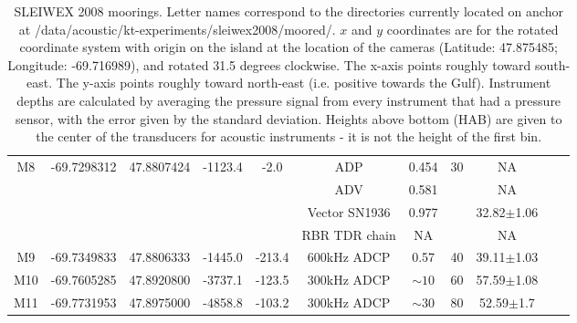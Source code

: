 \documentclass[letterpaper,10pt,landscape]{article}
\begin{document}
\begin{table}
\begin{tabular}{|c|c|c|c|c|c|c|c|c|c|c|}
                                                                                                                                                                                                                          
      \multirow{4}{*}{M8} & \multirow{4}{*}{-69.7298312} & \multirow{4}{*}{47.8807424} & \multirow{4}{*}{-1123.4}  & \multirow{4}{*}{-2.0}   & ADP                & 0.454      & \multirow{4}{*}{30} & NA                & \\ 
                          &                              &                             &                           &                         & ADV                & 0.581      &                     & NA                & \\ 
                          &                              &                             &                           &                         & Vector SN1936      & 0.977      &                     & 32.82$\pm$1.06    & \\ 
                          &                              &                             &                           &                         & RBR TDR chain      & NA         &                     & NA                & \\ \hline
       M9                 & -69.7349833                  & 47.8806333                  & -1445.0                   & -213.4                  & 600kHz ADCP        & 0.57       & 40                  & 39.11$\pm$1.03    & \\ \hline
       M10                & -69.7605285                  & 47.8920800                  & -3737.1                   & -123.5                  & 300kHz ADCP        & $\sim10$   & 60                  & 57.59$\pm$1.08    & \\ \hline
       M11                & -69.7731953                  & 47.8975000                  & -4858.8                   & -103.2                  & 300kHz ADCP        & $\sim30$   & 80                  & 52.59$\pm$1.7     & \\ \hline
    \end{tabular}
    \caption{SLEIWEX 2008 moorings. Letter names correspond to the directories currently located on anchor at /data/acoustic/kt-experiments/sleiwex2008/moored/. $x$ and $y$ coordinates are for the rotated coordinate system with origin on the island at the location of the cameras (Latitude: 47.875485; Longitude: -69.716989), and rotated 31.5 degrees clockwise. The x-axis points roughly toward south-east. The y-axis points roughly toward north-east (i.e. positive towards the Gulf). Instrument depths are calculated by averaging the pressure signal from every instrument that had a pressure sensor, with the error given by the standard deviation. Heights above bottom (HAB) are given to the center of the transducers for acoustic instruments - it is not the height of the first bin.}
  \end{table}
\end{document}

